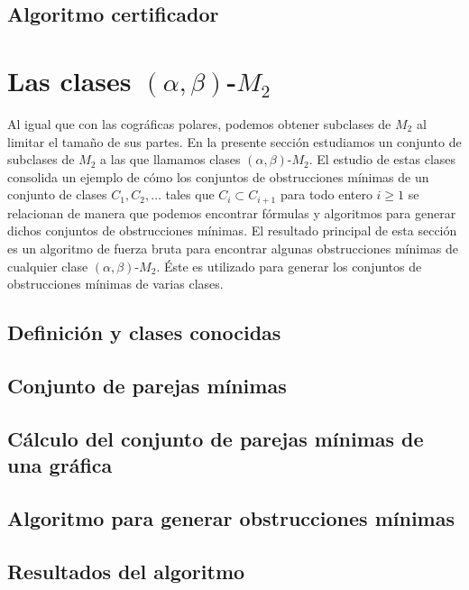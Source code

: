     \subsection{Algoritmo certificador}
        

\section{Las clases $(\alpha, \beta)$-$M_2$}

    Al igual que con las cográficas polares, podemos obtener subclases de $M_2$ al limitar el tamaño de sus partes. En la presente sección estudiamos un conjunto de subclases de $M_2$ a las que llamamos clases $(\alpha, \beta)$-$M_2$. El estudio de estas clases consolida un ejemplo de cómo los conjuntos de obstrucciones mínimas de un conjunto de clases $C_1,C_2, \dots$ tales que $C_i \subset C_{i+1}$ para todo entero $i \geq 1$ se relacionan de manera que podemos encontrar fórmulas y algoritmos para generar dichos conjuntos de obstrucciones mínimas. El resultado principal de esta sección es un algoritmo de fuerza bruta para encontrar algunas obstrucciones mínimas de cualquier clase $(\alpha, \beta)$-$M_2$. Éste es utilizado para generar los conjuntos de obstrucciones mínimas de varias clases. 
    
    \subsection{Definición y clases conocidas}
        

    \subsection{Conjunto de parejas mínimas}
        

    \subsection{Cálculo del conjunto de parejas mínimas de una gráfica}
        

    \subsection{Algoritmo para generar obstrucciones mínimas}
		
    
    \subsection{Resultados del algoritmo}

